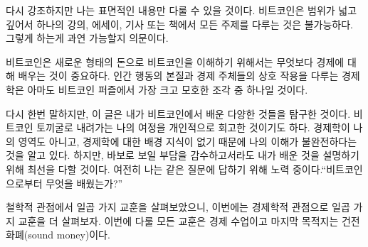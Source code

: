 다시 강조하지만 나는 표면적인 내용만 다룰 수 있을 것이다.  
비트코인은 범위가 넓고 깊어서 하나의 강의, 에세이, 기사 또는 책에서 모든 주제를 다루는 것은 불가능하다.
그렇게 하는게 과연 가능할지 의문이다.  


비트코인은 새로운 형태의 돈으로 비트코인을 이해하기 위해서는 무엇보다 경제에 대해 배우는 것이 중요하다.
인간 행동의 본질과 경제 주체들의 상호 작용을 다루는 경제학은 아마도 비트코인 퍼즐에서 가장 크고 모호한 조각 중 하나일 것이다.

다시 한번 말하지만, 이 글은 내가 비트코인에서 배운 다양한 것들을 탐구한 것이다. 
비트코인 토끼굴로 내려가는 나의 여정을 개인적으로 회고한 것이기도 하다.  
경제학이 나의 영역도 아니고, 경제학에 대한 배경 지식이 없기 때문에 나의 이해가 불완전하다는 것을 알고 있다. 
하지만, 바보로 보일 부담을 감수하고서라도 내가 배운 것을 설명하기 위해 최선을 다할 것이다.
여전히 나는 같은 질문에 답하기 위해 노력 중이다.\enquote{비트코인으로부터 무엇을 배웠는가?}

철학적 관점에서 일곱 가지 교훈을 살펴보았으니, 이번에는 경제학적 관점으로 일곱 가지 교훈을 더 살펴보자.
이번에 다룰 모든 교훈은 경제 수업이고 마지막 목적지는 건전화폐(sound money)이다.


